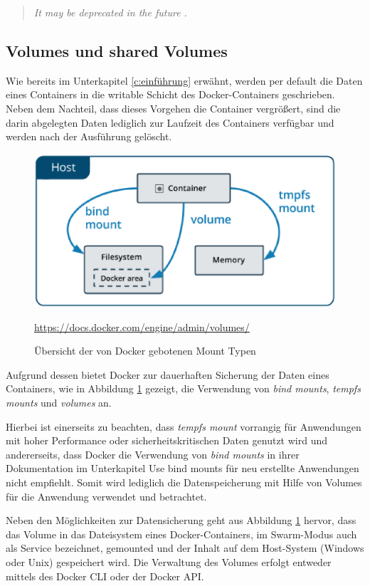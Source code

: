 \begin{quote}
	\textit{\glqq{}It may be deprecated in the future \cite{Docker:online3}.\grqq{}}
\end{quote}

\subsection{Volumes und shared Volumes}

Wie bereits im Unterkapitel \ref{c:einführung} erwähnt, werden per default die Daten eines Containers in die writable Schicht des Docker-Containers geschrieben. 
Neben dem Nachteil, dass dieses Vorgehen die Container vergrößert, sind die darin abgelegten Daten lediglich zur Laufzeit des Containers verfügbar und werden nach der Ausführung gelöscht.

\begin{figure}
	\centering
	\includegraphics[width=0.7\linewidth]{figures/DockerMounts}
	\caption[Docker Mount Typen]{Übersicht der von Docker gebotenen Mount Typen}
	\label{fig:dockermounts}
	\tiny{\quelle\url{https://docs.docker.com/engine/admin/volumes/}}
\end{figure}

Aufgrund dessen bietet Docker zur dauerhaften Sicherung der Daten eines Containers, wie in Abbildung \ref{fig:dockermounts} gezeigt, die Verwendung von \textit{bind mounts}, \textit{tempfs mounts} und \textit{volumes} an.

Hierbei ist einerseits zu beachten, dass \textit{tempfs mount} vorrangig für Anwendungen mit hoher Performance oder sicherheitskritischen Daten genutzt wird und andererseits, dass Docker die Verwendung von \textit{bind mounts} in ihrer Dokumentation im Unterkapitel \glqq{}Use bind mounts\grqq{} für neu erstellte Anwendungen nicht empfiehlt. 
Somit wird lediglich die Datenspeicherung mit Hilfe von Volumes für die Anwendung verwendet und betrachtet.

Neben den Möglichkeiten zur Datensicherung geht aus Abbildung \ref{fig:dockermounts} hervor, dass das Volume in das Dateisystem eines Docker-Containers, im Swarm-Modus auch als Service bezeichnet, gemounted und der Inhalt auf dem Host-System (Windows oder Unix) gespeichert wird. 
Die Verwaltung des Volumes erfolgt entweder mittels des Docker \ac{CLI} oder der Docker API.

